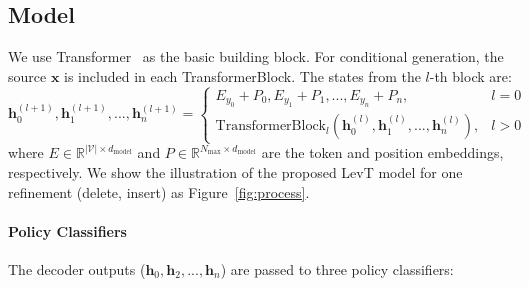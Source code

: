 \documentclass{article}
\begin{document}
\subsection{Model}
\label{sec:model}
We use Transformer~\citep{vaswani2017attention} as the basic building block. For conditional generation, the source $\bm{x}$ is included in each TransformerBlock. The states from the $l$-th block are:
\begin{equation}
    \bm{h}_0^{(l+1)}, \bm{h}_1^{(l+1)}, ..., \bm{h}_n^{(l+1)} = \left\{\begin{matrix}
 E_{y_0} + P_0, E_{y_1} + P_1,..., E_{y_n} + P_n,  & l = 0  \\ 
 \text{TransformerBlock}_l(\bm{h}_0^{(l)}, \bm{h}_1^{(l)}, ..., \bm{h}_n^{(l)}), & l > 0
\end{matrix}\right.
\end{equation}
where $E \in \mathbb{R}^{|\mathcal{V}|\times d_\text{model}}$ and $P \in \mathbb{R}^{N_{\text{max}}\times d_\text{model}}$ are the token and position embeddings, respectively. We show the illustration of the proposed LevT model for one refinement (delete, insert) as Figure~\ref{fig:process}. 

\paragraph{Policy Classifiers} The decoder outputs ($\bm{h}_0, \bm{h}_2, ..., \bm{h}_n$) are passed to three policy classifiers:
\end{document}
